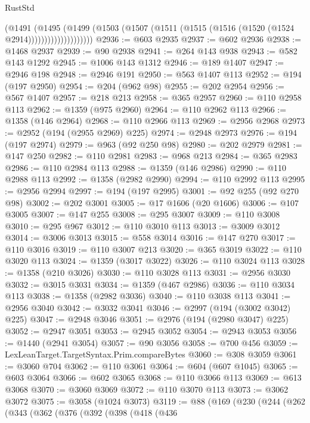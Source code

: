 \begin{lexlean}{RustStd}
\begin{coremodule}
{\begin{coremodule}
{{{{{{{{{{{{{{{{{{{{{{{{{{{{{{{{{{{{{{{{{{{{{                        (@1491
                          (@1495
                            (@1499
                              (@1503
                                (@1507 (@1511 (@1515 (@1516 (@1520 (@1524 @2914))))))))))))))))))))
@2936 := @603 @2935
@2937 := @602 @2936
@2938 := @1468 @2937
@2939 := @90 @2938
@2941 := @264 @143 @938
@2943 := @582 @143 @1292
@2945 := @1006 @143 @1312
@2946 := @189 @1407
@2947 := @2946 @198
@2948 := @2946 @191
@2950 := @563 @1407 @113
@2952 := @194 (@197 @2950)
@2954 := @204 (@962 @98)
@2955 := @202 @2954
@2956 := @567 @1407
@2957 := @218 @213
@2958 := @365 @2957
@2960 := @110 @2958 @113
@2962 := @1359 (@975 @2960)
@2964 := @110 @2962 @113
@2966 := @1358 (@146 @2964)
@2968 := @110 @2966 @113
@2969 := @2956 @2968
@2973 := @2952 (@194 (@2955 @2969) @225)
@2974 := @2948 @2973
@2976 := @194 (@197 @2974)
@2979 := @963 (@92 @250 @98)
@2980 := @202 @2979
@2981 := @147 @250
@2982 := @110 @2981
@2983 := @968 @213
@2984 := @365 @2983
@2986 := @110 @2984 @113
@2988 := @1359 (@146 @2986)
@2990 := @110 @2988 @113
@2992 := @1358 (@2982 @2990)
@2994 := @110 @2992 @113
@2995 := @2956 @2994
@2997 := @194 (@197 @2995)
@3001 := @92 @255 (@92 @270 @98)
@3002 := @202 @3001
@3005 := @17 @1606 (@20 @1606)
@3006 := @107 @3005
@3007 := @147 @255
@3008 := @295 @3007
@3009 := @110 @3008
@3010 := @295 @967
@3012 := @110 @3010 @113
@3013 := @3009 @3012
@3014 := @3006 @3013
@3015 := @558 @3014
@3016 := @147 @270
@3017 := @110 @3016
@3019 := @110 @3007 @213
@3020 := @365 @3019
@3022 := @110 @3020 @113
@3024 := @1359 (@3017 @3022)
@3026 := @110 @3024 @113
@3028 := @1358 (@210 @3026)
@3030 := @110 @3028 @113
@3031 := @2956 @3030
@3032 := @3015 @3031
@3034 := @1359 (@467 @2986)
@3036 := @110 @3034 @113
@3038 := @1358 (@2982 @3036)
@3040 := @110 @3038 @113
@3041 := @2956 @3040
@3042 := @3032 @3041
@3046 := @2997 (@194 (@3002 @3042) @225)
@3047 := @2948 @3046
@3051 := @2976 (@194 (@2980 @3047) @225)
@3052 := @2947 @3051
@3053 := @2945 @3052
@3054 := @2943 @3053
@3056 := @1440 (@2941 @3054)
@3057 := @90 @3056
@3058 := @700 @456
@3059 := LexLeanTarget.TargetSyntax.Prim.compareBytes
@3060 := @308 @3059
@3061 := @3060 @704
@3062 := @110 @3061
@3064 := @604 (@607 @1045)
@3065 := @603 @3064
@3066 := @602 @3065
@3068 := @110 @3066 @113
@3069 := @613 @3068
@3070 := @3060 @3069
@3072 := @110 @3070 @113
@3073 := @3062 @3072
@3075 := @3058 (@1024 @3073)
@3119 := @88
    (@169
      (@230
        (@244
          (@262
            (@343
              (@362
                (@376
                  (@392
                    (@398
                      (@418
                        (@436
}}}}}}}}}}}}}}}}}}}}}}}}}}}}}}}}}}}}}}}}}}}}}
\end{coremodule}}
\end{coremodule}
\end{lexlean}
